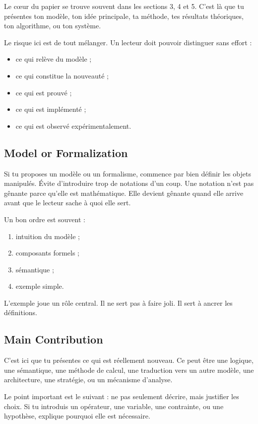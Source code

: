 \documentclass[11pt,a4paper]{article}
\theoremstyle{definition}
\begin{document}
Le cœur du papier se trouve souvent dans les sections 3, 4 et 5. C'est là que tu présentes ton modèle, ton idée principale, ta méthode, tes résultats théoriques, ton algorithme, ou ton système.

Le risque ici est de tout mélanger. Un lecteur doit pouvoir distinguer sans effort :
\begin{itemize}
    \item ce qui relève du modèle ;
    \item ce qui constitue la nouveauté ;
    \item ce qui est prouvé ;
    \item ce qui est implémenté ;
    \item ce qui est observé expérimentalement.
\end{itemize}


\subsection*{Model or Formalization}

Si tu proposes un modèle ou un formalisme, commence par bien définir les objets manipulés. Évite d'introduire trop de notations d'un coup. Une notation n'est pas gênante parce qu'elle est mathématique. Elle devient gênante quand elle arrive avant que le lecteur sache à quoi elle sert.

Un bon ordre est souvent :
\begin{enumerate}[label=\arabic*.]
    \item intuition du modèle ;
    \item composants formels ;
    \item sémantique ;
    \item exemple simple.
\end{enumerate}

L'exemple joue un rôle central. Il ne sert pas à faire joli. Il sert à ancrer les définitions.


\subsection*{Main Contribution}

C'est ici que tu présentes ce qui est réellement nouveau. Ce peut être une logique, une sémantique, une méthode de calcul, une traduction vers un autre modèle, une architecture, une stratégie, ou un mécanisme d'analyse.

Le point important est le suivant : ne pas seulement décrire, mais justifier les choix. Si tu introduis un opérateur, une variable, une contrainte, ou une hypothèse, explique pourquoi elle est nécessaire.
\end{document}
